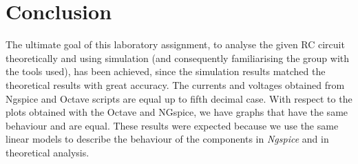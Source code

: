 \section{Conclusion}
\label{sec:conclusion}


The ultimate goal of this laboratory assignment, to analyse
the given RC circuit theoretically and using simulation (and consequently
familiarising the group with the tools used), has been achieved, since
the simulation results matched the theoretical results with great accuracy. The currents and voltages obtained from  Ngspice
and Octave scripts are equal up to fifth decimal case.
With respect to the plots obtained with the Octave and NGspice, we have graphs that have the same behaviour and are equal.
These results were expected because we use the same linear models to
describe the behaviour of the components in \textit{Ngspice} and in
theoretical analysis.

